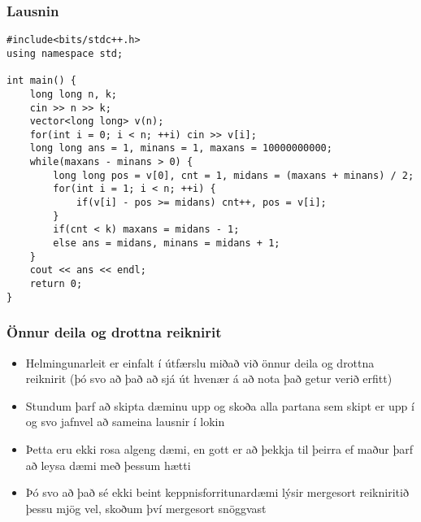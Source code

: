 \documentclass{beamer}
\begin{document}
\begin{frame}[fragile]
\frametitle{Lausnin}

\begin{scriptsize}
\begin{verbatim}
#include<bits/stdc++.h>
using namespace std;

int main() {
    long long n, k;
    cin >> n >> k;
    vector<long long> v(n);
    for(int i = 0; i < n; ++i) cin >> v[i];
    long long ans = 1, minans = 1, maxans = 10000000000;
    while(maxans - minans > 0) {
        long long pos = v[0], cnt = 1, midans = (maxans + minans) / 2;
        for(int i = 1; i < n; ++i) {
            if(v[i] - pos >= midans) cnt++, pos = v[i];
        }
        if(cnt < k) maxans = midans - 1;
        else ans = midans, minans = midans + 1;
    }
    cout << ans << endl;
    return 0;
}
\end{verbatim}
\end{scriptsize}

\end{frame}

\begin{frame}
\frametitle{Önnur deila og drottna reiknirit}

\begin{itemize}

\item<1-> Helmingunarleit er einfalt í útfærslu miðað við önnur deila og drottna reiknirit (þó svo að það að sjá út hvenær á að nota það getur verið erfitt)

\item<2-> Stundum þarf að skipta dæminu upp og skoða alla partana sem skipt er upp í og svo jafnvel að sameina lausnir í lokin

\item<3-> Þetta eru ekki rosa algeng dæmi, en gott er að þekkja til þeirra ef maður þarf að leysa dæmi með þessum hætti

\item<4-> Þó svo að það sé ekki beint keppnisforritunardæmi lýsir mergesort reikniritið þessu mjög vel, skoðum því mergesort snöggvast

\end{itemize}

\end{frame}
\end{document}
